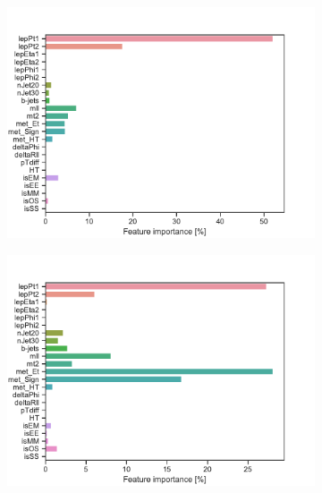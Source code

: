 \begin{figure}[H]
    \centering
    \begin{subfigure}[t!]{0.49\textwidth}
        \includegraphics[width = \textwidth]{Figures/SlepSlep/ML/BDT/All_level/High/featureImportance.pdf}
        \caption{}
        \label{fig:featSlepslepLow}
    \end{subfigure}
    \begin{subfigure}[t!]{0.49\textwidth}
        \includegraphics[width = \textwidth]{Figures/SlepSnu/BDT/All_level/High/featureImportance.pdf}
        \caption{}
        \label{fig:featSlepsnuLow}
    \end{subfigure}
    \begin{subfigure}[t!]{0.49\textwidth}

\end{subfigure}
\end{figure}
